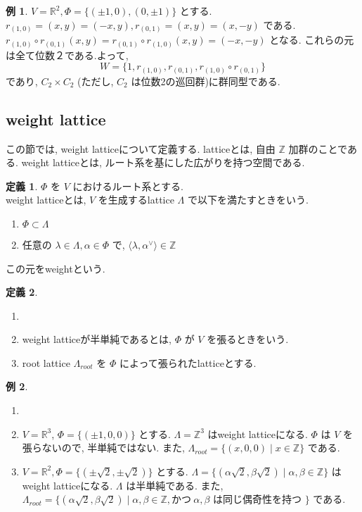 \documentclass[
  a4paper, 
  12pt,
  ja=standard,
  xelatex,
  left=30truemm,
  right=30truemm,
  titlepage 
]{bxjsarticle}
\theoremstyle{definition}
\newtheorem{df}{定義}
\newtheorem*{ex}{例}
\begin{document}
\begin{ex}
  $V = \mathbb{R}^2, \Phi = \{ (\pm 1, 0), (0, \pm 1) \}$ とする. \\
  $r_{ (1, 0)} = (x, y) = (-x, y), r_{ (0 ,1)} =(x, y) = (x, -y)$ である.
  $r_{ (1, 0)} \circ r_{ (0 ,1)}(x, y) = r_{ (0, 1)} \circ r_{ (1 ,0)}(x, y) = (-x, -y)$ となる.
  これらの元は全て位数２である.よって, 
  $$ W = \{ 1, r_{ (1, 0)}, r_{ (0 ,1)}, r_{ (1, 0)} \circ r_{ (0 ,1)} \}$$
  であり, $C_2 \times C_2 $ (ただし, $C_2$ は位数2の巡回群)に群同型である.
\end{ex}

\subsection{weight lattice}
  この節では, weight latticeについて定義する. latticeとは, 自由 $\mathbb{Z}$ 加群のことである.
  weight latticeとは, ルート系を基にした広がりを持つ空間である. 
\bigskip

\begin{df}
  $\Phi$ を $V$ におけるルート系とする. \\
  weight latticeとは, $V$ を生成するlattice $\Lambda$ で以下を満たすときをいう.
  \begin{enumerate}
    \item $\Phi \subset \Lambda $
    \item 任意の $ \lambda \in \Lambda, \alpha \in \Phi $ で, $ \langle \lambda, \alpha^{ \vee } \rangle \in \mathbb{Z} $
  \end{enumerate}
  この元をweightという.
\end{df}

\begin{df}
  \begin{enumerate}
    \item[]
    \item weight latticeが半単純であるとは, $\Phi$ が $V$ を張るときをいう.
    \item root lattice $\Lambda_{ root }$ を $\Phi$ によって張られたlatticeとする.
  \end{enumerate}
\end{df}

\begin{ex}
  \begin{enumerate}
    \item[]
    \item $V = \mathbb{R}^3$, $\Phi = \{ (\pm1, 0, 0) \}$ とする. $\Lambda = \mathbb{Z}^3$ はweight latticeになる.
          $\Phi$ は $V$ を張らないので, 半単純ではない. また, $\Lambda_{ root } = \{ (x, 0 , 0) \mid x \in \mathbb{Z} \}$ である.
    \item $V = \mathbb{R}^2, \Phi = \{ (\pm \sqrt{2}, \pm \sqrt{2}) \}$ とする. $\Lambda = \{  (\alpha \sqrt{2}, \beta \sqrt{2}) \mid \alpha, \beta \in \mathbb{Z} \}$ はweight latticeになる.
          $\Lambda$ は半単純である. また, $\Lambda_{ root } = \{  (\alpha \sqrt{2}, \beta \sqrt{2}) \mid \alpha, \beta \in \mathbb{Z}, \text{かつ} \ \alpha, \beta \text{ は同じ偶奇性を持つ }\}$ である.
  \end{enumerate}
\end{ex}
\end{document}
